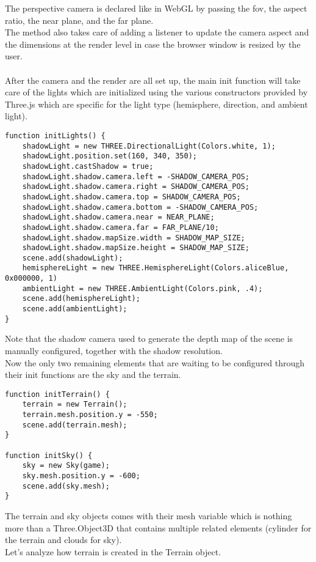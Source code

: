\documentclass[a4paper,11pt]{article}
\begin{document}
The perspective camera is declared like in WebGL by passing the fov, the aspect ratio, the near plane, and the far plane.\\
The method also takes care of adding a listener to update the camera aspect and the dimensions at the render level in case the browser window is resized by the user.\\\\
After the camera and the render are all set up, the main init function will take care of the lights which are initialized using the various constructors provided by Three.js which are specific for the light type (hemisphere, direction, and ambient light).
\begin{verbatim}
function initLights() {
    shadowLight = new THREE.DirectionalLight(Colors.white, 1);
    shadowLight.position.set(160, 340, 350);
    shadowLight.castShadow = true;
    shadowLight.shadow.camera.left = -SHADOW_CAMERA_POS;
    shadowLight.shadow.camera.right = SHADOW_CAMERA_POS;
    shadowLight.shadow.camera.top = SHADOW_CAMERA_POS;
    shadowLight.shadow.camera.bottom = -SHADOW_CAMERA_POS;
    shadowLight.shadow.camera.near = NEAR_PLANE;
    shadowLight.shadow.camera.far = FAR_PLANE/10;
    shadowLight.shadow.mapSize.width = SHADOW_MAP_SIZE;
    shadowLight.shadow.mapSize.height = SHADOW_MAP_SIZE;
    scene.add(shadowLight);
    hemisphereLight = new THREE.HemisphereLight(Colors.aliceBlue, 0x000000, 1)
    ambientLight = new THREE.AmbientLight(Colors.pink, .4);
    scene.add(hemisphereLight);
    scene.add(ambientLight);
}
\end{verbatim}
Note that the shadow camera used to generate the depth map of the scene is manually configured, together with the shadow resolution.\\
Now the only two remaining elements that are waiting to be configured through their init functions are the sky and the terrain.\\
\begin{verbatim}
function initTerrain() {
    terrain = new Terrain();
    terrain.mesh.position.y = -550;
    scene.add(terrain.mesh);
}

function initSky() {
    sky = new Sky(game);
    sky.mesh.position.y = -600;
    scene.add(sky.mesh);
}
\end{verbatim}
The terrain and sky objects comes with their mesh variable which is nothing more than a Three.Object3D that contains multiple related elements (cylinder for the terrain and clouds for sky).\\
Let's analyze how terrain is created in the Terrain object.
\end{document}
